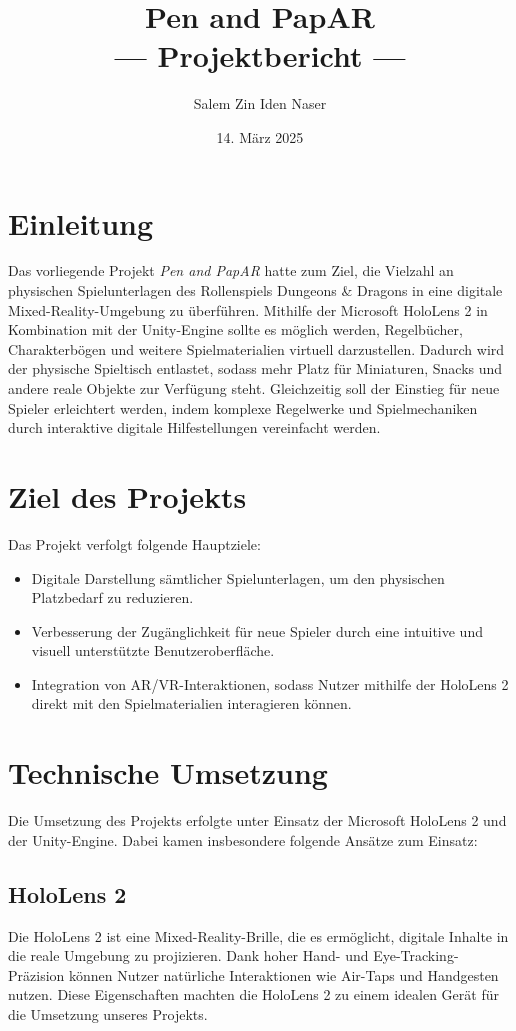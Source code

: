 \documentclass[11pt]{article}
\title{Pen and PapAR \\ \large --- Projektbericht ---}
\author{Salem Zin Iden Naser}
\date{14. März 2025}
\begin{document}
\maketitle

\section{Einleitung}\label{sec:einleitung}
Das vorliegende Projekt \textit{Pen and PapAR} hatte zum Ziel, die Vielzahl an physischen Spielunterlagen des Rollenspiels Dungeons \& Dragons in eine digitale Mixed-Reality-Umgebung zu überführen. Mithilfe der Microsoft HoloLens 2 in Kombination mit der Unity-Engine sollte es möglich werden, Regelbücher, Charakterbögen und weitere Spielmaterialien virtuell darzustellen. Dadurch wird der physische Spieltisch entlastet, sodass mehr Platz für Miniaturen, Snacks und andere reale Objekte zur Verfügung steht. Gleichzeitig soll der Einstieg für neue Spieler erleichtert werden, indem komplexe Regelwerke und Spielmechaniken durch interaktive digitale Hilfestellungen vereinfacht werden.

\section{Ziel des Projekts}\label{sec:ziel}
Das Projekt verfolgt folgende Hauptziele:
\begin{itemize}[noitemsep]
    \item Digitale Darstellung sämtlicher Spielunterlagen, um den physischen Platzbedarf zu reduzieren.
    \item Verbesserung der Zugänglichkeit für neue Spieler durch eine intuitive und visuell unterstützte Benutzeroberfläche.
    \item Integration von AR/VR-Interaktionen, sodass Nutzer mithilfe der HoloLens 2 direkt mit den Spielmaterialien interagieren können.
\end{itemize}

\section{Technische Umsetzung}\label{sec:technische_umsetzung}
Die Umsetzung des Projekts erfolgte unter Einsatz der Microsoft HoloLens 2 und der Unity-Engine. Dabei kamen insbesondere folgende Ansätze zum Einsatz:

\subsection{HoloLens 2}
Die HoloLens 2 ist eine Mixed-Reality-Brille, die es ermöglicht, digitale Inhalte in die reale Umgebung zu projizieren. Dank hoher Hand- und Eye-Tracking-Präzision können Nutzer natürliche Interaktionen wie Air-Taps und Handgesten nutzen. Diese Eigenschaften machten die HoloLens 2 zu einem idealen Gerät für die Umsetzung unseres Projekts.
\end{document}
